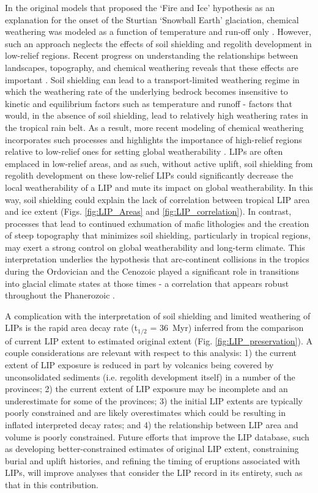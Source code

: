 \documentclass[11pt,letterpaper]{article}
\begin{document}
In the original models that proposed the `Fire and Ice' hypothesis as an explanation for the onset of the Sturtian `Snowball Earth' glaciation, chemical weathering was modeled as a function of temperature and run-off only \citep{Donnadieu2004a}. However, such an approach neglects the effects of soil shielding and regolith development in low-relief regions. Recent progress on understanding the relationships between landscapes, topography, and chemical weathering reveals that these effects are important \citep{Gabet2009a, Maher2014a, Godderis2017b}. Soil shielding can lead to a transport-limited weathering regime in which the weathering rate of the underlying bedrock becomes insensitive to kinetic and equilibrium factors such as temperature and runoff - factors that would, in the absence of soil shielding, lead to relatively high weathering rates in the tropical rain belt. As a result, more recent modeling of chemical weathering incorporates such processes and highlights the importance of high-relief regions relative to low-relief ones for setting global weatherability \citep{West2012a, Godderis2017b}. LIPs are often emplaced in low-relief areas, and as such, without active uplift, soil shielding from regolith development on these low-relief LIPs could significantly decrease the local weatherability of a LIP and mute its impact on global weatherability. In this way, soil shielding could explain the lack of correlation between tropical LIP area and ice extent (Figs. \ref{fig:LIP_Areas} and \ref{fig:LIP_correlation}). In contrast, processes that lead to continued exhumation of mafic lithologies and the creation of steep topography that minimizes soil shielding, particularly in tropical regions, may exert a strong control on global weatherability and long-term climate. This interpretation underlies the hypothesis that arc-continent collisions in the tropics during the Ordovician \citep{Swanson-Hysell2017a} and the Cenozoic \citep{Jagoutz2016a} played a significant role in transitions into glacial climate states at those times - a correlation that appears robust throughout the Phanerozoic \citep{Macdonald2019a}.

A complication with the interpretation of soil shielding and limited weathering of LIPs is the rapid area decay rate (t$_{1/2}$ = 36~Myr) inferred from the comparison of current LIP extent to estimated original extent (Fig. \ref{fig:LIP_preservation}). A couple considerations are relevant with respect to this analysis: 1) the current extent of LIP exposure is reduced in part by volcanics being covered by unconsolidated sediments (i.e. regolith development itself) in a number of the provinces; 2) the current extent of LIP exposure may be incomplete and an underestimate for some of the provinces; 3) the initial LIP extents are typically poorly constrained and are likely overestimates which could be resulting in inflated interpreted decay rates; and 4) the relationship between LIP area and volume is poorly constrained. Future efforts that improve the LIP database, such as developing better-constrained estimates of original LIP extent, constraining burial and uplift histories, and refining the timing of eruptions associated with LIPs, will improve analyses that consider the LIP record in its entirety, such as that in this contribution.
\end{document}
